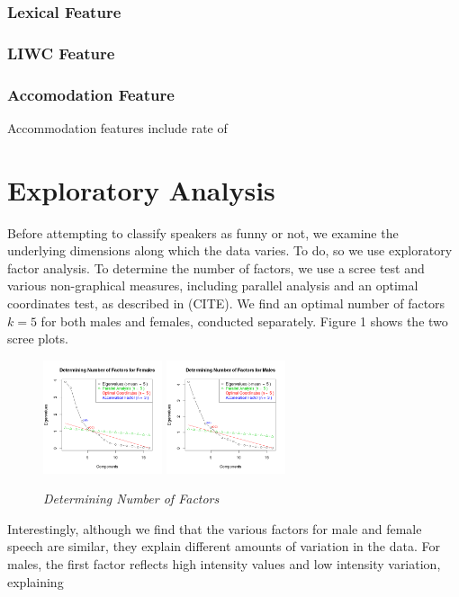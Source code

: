 \documentclass[a4paper]{article}
\begin{document}
\subsubsection{Lexical Feature}

\subsubsection{LIWC Feature}

\subsubsection{Accomodation Feature}
Accommodation features include rate of 

\section{Exploratory Analysis}
Before attempting to classify speakers as funny or not, we examine the underlying dimensions along which the data varies.  To do, so we use exploratory factor analysis. To determine the number of factors, we use a scree test and various non-graphical measures, including parallel analysis and an optimal coordinates test, as described in (CITE).  We find an optimal number of factors $k = 5$ for both males and females, conducted separately.  Figure 1 shows the two scree plots.

\begin{figure}[t]
\includegraphics[width = 3.5cm]{graphics/ScreeFem.png}
\includegraphics[width = 3.5cm]{graphics/ScreeMale.png}
\caption{{\it Determining Number of Factors}}  
\end{figure}

Interestingly, although we find that the various factors for male and female speech are similar, they explain different amounts of variation in the data.  For males, the first factor reflects high intensity values and low intensity variation, explaining   
\end{document}
